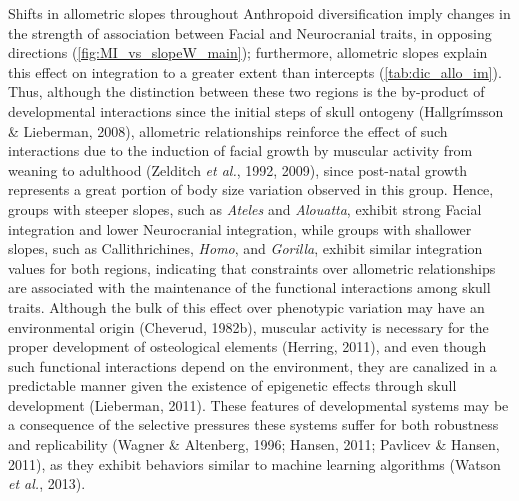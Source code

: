 \documentclass[12pt,twoside]{report}
\begin{document}
Shifts in allometric slopes throughout Anthropoid diversification imply
changes in the strength of association between Facial and Neurocranial
traits, in opposing directions (\autoref{fig:MI_vs_slopeW_main});
furthermore, allometric slopes explain this effect on integration to a
greater extent than intercepts (\autoref{tab:dic_allo_im}). Thus,
although the distinction between these two regions is the by-product of
developmental interactions since the initial steps of skull ontogeny
(Hallgrímsson \& Lieberman, 2008), allometric relationships reinforce
the effect of such interactions due to the induction of facial growth by
muscular activity from weaning to adulthood (Zelditch \emph{et al.},
1992, 2009), since post-natal growth represents a great portion of body
size variation observed in this group. Hence, groups with steeper
slopes, such as \emph{Ateles} and \emph{Alouatta}, exhibit strong Facial
integration and lower Neurocranial integration, while groups with
shallower slopes, such as Callithrichines, \emph{Homo}, and
\emph{Gorilla}, exhibit similar integration values for both regions,
indicating that constraints over allometric relationships are associated
with the maintenance of the functional interactions among skull traits.
Although the bulk of this effect over phenotypic variation may have an
environmental origin (Cheverud, 1982b), muscular activity is necessary
for the proper development of osteological elements (Herring, 2011), and
even though such functional interactions depend on the environment, they
are canalized in a predictable manner given the existence of epigenetic
effects through skull development (Lieberman, 2011). These features of
developmental systems may be a consequence of the selective pressures
these systems suffer for both robustness and replicability (Wagner \&
Altenberg, 1996; Hansen, 2011; Pavlicev \& Hansen, 2011), as they
exhibit behaviors similar to machine learning algorithms (Watson
\emph{et al.}, 2013).
\end{document}
